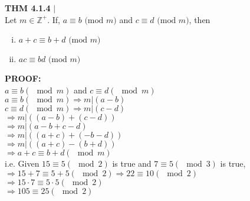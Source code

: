 \documentclass [12pt]{article}
\begin{document}
\begin{framed}
\textbf{THM 4.1.4} $|$ \\
\vspace{0.5cm}
Let $m \in \mathbb{Z}^{+}$. If, $a \equiv b \text{ (mod }m) $ and $c \equiv d \text{ (mod }m) $, then\\
\begin{enumerate}[(i)]
\item $a+c \equiv b+d \text{ (mod } m)$
\item $ac \equiv bd \text{ (mod } m)$
\end{enumerate}
\end{framed}
\vspace{0.25cm}
\textbf{PROOF:}\\
\quad $a \equiv b (\mod m)$ and $c \equiv d (\mod m)$\\
\quad $a \equiv b (\mod m) \Rightarrow m | (a-b)$\\
\quad $c \equiv d (\mod m) \Rightarrow m | (c-d)$\\
\quad $\Rightarrow m|((a - b) + (c - d))$\\
\quad $\Rightarrow m|(a - b + c - d)$\\
\quad $\Rightarrow m|((a + c) + (-b - d))$\\
\quad $\Rightarrow m|((a + c) - (b + d))$\\
\quad $\Rightarrow a + c \equiv b + d (\mod m)$ \checkmark\\
\vspace{0.2in}
i.e. Given $15 \equiv 5 (\mod 2)$ is true and $7 \equiv 5 (\mod 3)$ is true,\\
\quad $\Rightarrow15 + 7 \equiv 5 + 5 (\mod 2) \Rightarrow 22 \equiv 10(\mod 2)$\\
\quad $\Rightarrow15\cdot 7 \equiv 5\cdot 5 (\mod 2)$\\
\quad $\Rightarrow 105\equiv 25 (\mod 2)$ \checkmark
\pagebreak
\end{document}
